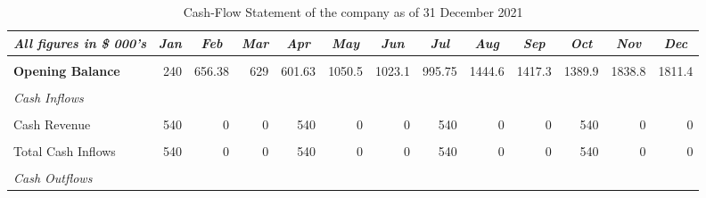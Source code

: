 \begin{table}[htbp]
  \centering
  \caption{Cash-Flow Statement of the company as of 31 December 2021}
    \begin{tabular}{|l|r|r|r|r|r|r|r|r|r|r|r|r|}
    \toprule
    \multicolumn{1}{|c|}{\textit{\textbf{All figures in \$ 000's}}} & \multicolumn{1}{c|}{\textit{\textbf{Jan}}} & \multicolumn{1}{c|}{\textit{\textbf{Feb}}} & \multicolumn{1}{c|}{\textit{\textbf{Mar}}} & \multicolumn{1}{c|}{\textit{\textbf{Apr}}} & \multicolumn{1}{c|}{\textit{\textbf{May }}} & \multicolumn{1}{c|}{\textit{\textbf{Jun}}} & \multicolumn{1}{c|}{\textit{\textbf{Jul}}} & \multicolumn{1}{c|}{\textit{\textbf{Aug}}} & \multicolumn{1}{c|}{\textit{\textbf{Sep}}} & \multicolumn{1}{c|}{\textit{\textbf{Oct}}} & \multicolumn{1}{c|}{\textit{\textbf{Nov}}} & \multicolumn{1}{c|}{\textit{\textbf{Dec}}} \\
    \midrule
          &       &       &       &       &       &       &       &       &       &       &       &  \\
    \midrule
    \textbf{Opening Balance} & 240   & 656.38 & 629   & 601.63 & 1050.5 & 1023.1 & 995.75 & 1444.6 & 1417.3 & 1389.9 & 1838.8 & 1811.4 \\
    \midrule
          &       &       &       &       &       &       &       &       &       &       &       &  \\
    \midrule
    \textit{Cash Inflows} &       &       &       &       &       &       &       &       &       &       &       &  \\
    \midrule
          &       &       &       &       &       &       &       &       &       &       &       &  \\
    \midrule
    Cash Revenue & 540   & 0     & 0     & 540   & 0     & 0     & 540   & 0     & 0     & 540   & 0     & 0 \\
    \midrule
          &       &       &       &       &       &       &       &       &       &       &       &  \\
    \midrule
    Total Cash Inflows & 540   & 0     & 0     & 540   & 0     & 0     & 540   & 0     & 0     & 540   & 0     & 0 \\
    \midrule
          &       &       &       &       &       &       &       &       &       &       &       &  \\
    \midrule
    \textit{Cash Outflows} &       &       &       &       &       &       &       &       &       &       &       &  \\

\end{tabular}
\end{table}
